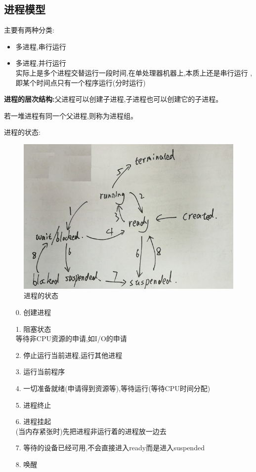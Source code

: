 \documentclass[UTF8,a4paper]{ctexart}
\begin{document}
  \subsection{进程模型}
  主要有两种分类:
  \begin{itemize}
    \item 多进程,串行运行
    \item 多进程,并行运行\\
    实际上是多个进程交替运行一段时间,在单处理器机器上,本质上还是串行运行
    ,即某个时间点只有一个程序运行(分时运行)
  \end{itemize}

  \textbf{进程的层次结构:}父进程可以创建子进程,子进程也可以创建它的子进程。

  若一堆进程有同一个父进程,则称为进程组。

  进程的状态:
  \begin{figure}[H]
    \centering
    \includegraphics[scale = 0.3]{assets/caozuoxitong_fe21f.png}
    \caption{进程的状态}
  \end{figure}

  \begin{itemize}
    \item [0.] 创建进程
    \item [1.] 阻塞状态\\
    等待非CPU资源的申请,如I/O的申请
    \item [2.] 停止运行当前进程,运行其他进程
    \item [3.] 运行当前程序
    \item [4.] 一切准备就绪(申请得到资源等),等待运行(等待CPU时间分配)
    \item [5.] 进程终止
    \item [6.] 进程挂起\\
    (当内存紧张时)先把进程非运行着的进程放一边去
    \item [7.] 等待的设备已经可用,不会直接进入ready而是进入suspended
    \item [8.] 唤醒

  \end{itemize}
\end{document}
